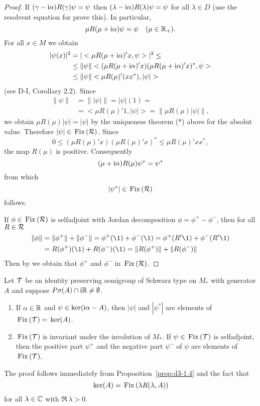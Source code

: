 \begin{proof}
If $(\gamma - \mathrm{i}\alpha)R(\gamma)\psi = \psi$ then $(\lambda - \mathrm{i}\alpha)R(\lambda)\psi = \psi$ for all $\lambda \in D$ (use the resolvent equation for prove this).
In particular, 
\[
\mu R(\mu + \mathrm{i}\alpha)\psi = \psi \quad (\mu \in \mathbb{R}_{+}).
\]
For all $x \in M$ we obtain
\begin{align*}
|\psi(x)|^2 &= |<\mu R(\mu+\im\alpha)'x,\psi>|^2 \leq \\
&\leq \|\psi\| <(\mu R(\mu+\im\alpha)'x)(\mu R(\mu+\im\alpha)'x)^{*},\psi>  \\
&\leq \|\psi\| <\mu R(\mu)'(xx^{*}),|\psi|>
\end{align*}
(see D-I, Corollary 2.2).
Since
\begin{align*}
\|\psi\| &= \| |\psi| \| = |\psi|(1) = \\
&= <\mu R(\mu)'1,|\psi|> = \| \mu R(\mu)|\psi| \|,
\end{align*}
we obtain $\mu R(\mu)|\psi| = |\psi|$ by the uniqueness 
theorem (*) above for the absolut value.
Therefore $|\psi| \in \mathop{}\mathrm{Fix}\left(\mathcal{R}\right) $.
Since
\[
0 \leq (\mu R(\mu)'x)(\mu R(\mu)'x)^{*} \leq \mu R(\mu)'xx^{*},
\]
the map $R(\mu)$ is positive.
Consequently 
\[
(\mu+\mathrm{i}\alpha)R(\mu)\psi^{*} = \psi^{*}
\]
from which 
\[
|\psi^{*}| \in \mathop{}\mathrm{Fix}\left(\mathcal{R}\right) 
\]
follows.

If $\phi \in \mathop{}\mathrm{Fix}\left(\mathcal{R}\right) $ is selfadjoint with Jordan decomposition $\phi = \phi^{+} - \phi^{-}$, then for all $ R \in \mathcal{R} $
\begin{align*}
\| \phi \| &= \| \phi^{+} \| + \| \phi^{-} \|  =
    \phi^{+}(\1) + \phi^{-}(\1) = \phi^{+}(R'\1) + \phi^{-}(R'\1) \\
    &= R(\phi^{+})(\1) + R(\phi^{-})(\1)  =
    \| R(\phi^{+}) \| + \| R(\phi^{-}) \| 
\end{align*}
Then by \citet[Theorem III.4.2.]{takesaki:1979} we obtain that $\phi^{+}$ and $\phi^{-}$ in $ \mathop{}\mathrm{Fix}\left(\mathcal{R}\right) $.
\end{proof}
\begin{corollary}\label{cor:d3-1.5}
Let $\mathcal{T}$ be an identity preserving semigroup of Schwarz type on $M_{*}$ with generator $A$ and suppose $P\sigma(A) \cap \mathrm{i}\mathbb{R} \neq \emptyset$.
\begin{enumerate}[\upshape (i)]
\item
If $\alpha \in \mathbb{R}$ and $\psi \in \operatorname{ker}(\mathrm{i}\alpha - A)$, then $|\psi|$ and $|\psi^{*}|$ are elements of $\mathop{}\mathrm{Fix}\left(\mathcal{T}\right) = \mathop{}\mathrm{ker}(A)$.

\item 
$\mathop{}\mathrm{Fix}\left(\mathcal{T}\right)$ is invariant under the involution of $M_{*}$.
If $\psi \in \mathop{}\mathrm{Fix}\left(\mathcal{T}\right)$ is selfadjoint, then the positive part $\psi^{+}$ and the negative part $\psi^{-}$ of $\psi$ are elements of $\mathop{}\mathrm{Fix}\left(\mathcal{T}\right)$.
\end{enumerate}

\end{corollary}
The proof follows immediately from Proposition~\ref{prop:d3-1.4} and the fact that 
\[ 
\mathop{}\mathrm{ker}(A) = \mathop{}\mathrm{Fix}\left(\lambda R(\lambda,A)\right)
\]
for all $\lambda \in \mathbb{C}$ with $\Re\,\lambda > 0$.

